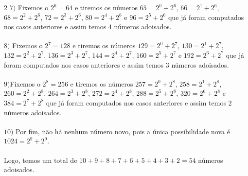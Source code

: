 \begin{solucoes}{2}
$7)$ Fixemos  o $2^6=64$ e tiremos os números $65=2^0+2^6$, $66=2^1+2^6$, $68=2^2+2^6$, $72=2^3+2^6$, $80=2^4+2^6$ e $96=2^5+2^6$ que já foram computados nos casos anteriores e assim temos $4$ números adoisados.
\\\\
$8)$ Fixemos  o $2^7=128$ e tiremos os números $129=2^0+2^7$, $130=2^1+2^7$, $132=2^2+2^7$, $136=2^3+2^7$, $144=2^4+2^7$, $160=2^5+2^7$ e $192=2^6+2^7$ que já foram computados nos casos anteriores e assim temos $3$ números adoisados.
\\\\
$9)$Fixemos  o $2^8=256$ e tiremos os números $257=2^0+2^8$, $258=2^1+2^8$, $260=2^2+2^8$, $264=2^3+2^8$, $272=2^4+2^8$, $288=2^5+2^8$, $320=2^6+2^8$ e $384=2^7+2^8$ que já foram computados nos casos anteriores e assim temos $2$ números adoisados.
\\\\ 
$10)$ Por fim, não há nenhum número novo, pois a única possibilidade nova é $1024=2^9+2^9$.
\\\\

Logo, temos um total de $10+9+8+7+6+5+4+3+2=54$ números adoisados.

\end{solucoes}






